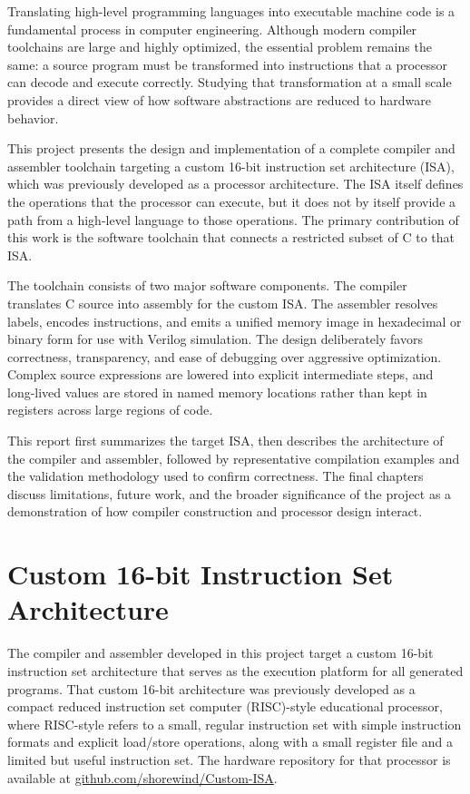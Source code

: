 \documentclass[12pt]{report}
\begin{document}
Translating high-level programming languages into executable machine code is a
fundamental process in computer engineering. Although modern compiler
toolchains are large and highly optimized, the essential problem remains the
same: a source program must be transformed into instructions that a processor
can decode and execute correctly. Studying that transformation at a small
scale provides a direct view of how software abstractions are reduced to
hardware behavior.

This project presents the design and implementation of a complete compiler and
assembler toolchain targeting a custom 16-bit instruction set architecture
(ISA), which was previously developed as a processor architecture. The ISA
itself defines the operations that the processor can execute, but it does not
by itself provide a path from a high-level language to those operations. The
primary contribution of this work is the software toolchain that connects a
restricted subset of C to that ISA.

The toolchain consists of two major software components. The compiler
translates C source into assembly for the custom ISA. The assembler resolves
labels, encodes instructions, and emits a unified memory image in hexadecimal
or binary form for use with Verilog simulation. The design deliberately favors
correctness, transparency, and ease of debugging over aggressive optimization.
Complex source expressions are lowered into explicit intermediate steps, and
long-lived values are stored in named memory locations rather than kept in
registers across large regions of code.

This report first summarizes the target ISA, then describes the architecture of
the compiler and assembler, followed by representative compilation examples and
the validation methodology used to confirm correctness. The final chapters
discuss limitations, future work, and the broader significance of the project
as a demonstration of how compiler construction and processor design interact.

\chapter{Custom 16-bit Instruction Set Architecture}

The compiler and assembler developed in this project target a custom 16-bit
instruction set architecture that serves as the execution platform for all
generated programs. That custom 16-bit architecture was previously developed
as a compact reduced instruction set computer (RISC)-style educational
processor, where RISC-style refers to a small, regular instruction set
with simple instruction formats and explicit load/store operations, along with
a small register file and a limited but useful instruction set. The hardware
repository for that processor is available at
\href{https://github.com/shorewind/Custom-ISA}{github.com/shorewind/Custom-ISA}.
\end{document}
